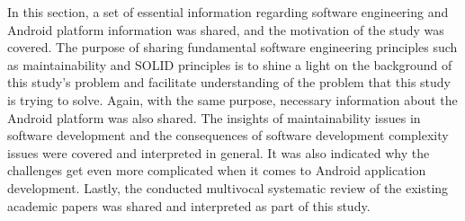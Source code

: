 In this section, a set of essential information regarding software engineering and Android platform information was shared, and the motivation of the study was covered. The purpose of sharing fundamental software engineering principles such as maintainability and SOLID principles is to shine a light on the background of this study's problem and facilitate understanding of the problem that this study is trying to solve. Again, with the same purpose, necessary information about the Android platform was also shared. The insights of maintainability issues in software development and the consequences of software development complexity issues were covered and interpreted in general. It was also indicated why the challenges get even more complicated when it comes to Android application development. Lastly, the conducted multivocal systematic review of the existing academic papers was shared and interpreted as part of this study.